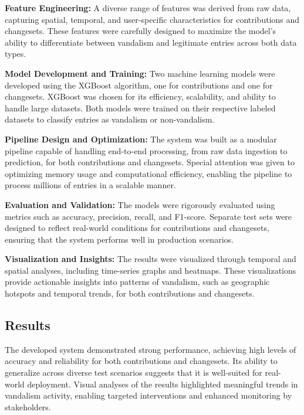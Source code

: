 \documentclass[
    13pt, %
    a4paper, %
    DIV14, %
    listof=totoc, %
    bibliography=totoc, %
    index=totoc, %
    headsepline
]{scrreprt}
\begin{document}
\noindent\textbf{Feature Engineering:} A diverse range of features was derived from raw data, capturing spatial, temporal, and user-specific characteristics for contributions and changesets. These features were carefully designed to maximize the model's ability to differentiate between vandalism and legitimate entries across both data types.

\noindent\textbf{Model Development and Training:} Two machine learning models were developed using the XGBoost algorithm, one for contributions and one for changesets. XGBoost was chosen for its efficiency, scalability, and ability to handle large datasets. Both models were trained on their respective labeled datasets to classify entries as vandalism or non-vandalism.

\noindent\textbf{Pipeline Design and Optimization:} The system was built as a modular pipeline capable of handling end-to-end processing, from raw data ingestion to prediction, for both contributions and changesets. Special attention was given to optimizing memory usage and computational efficiency, enabling the pipeline to process millions of entries in a scalable manner.

\noindent\textbf{Evaluation and Validation:} The models were rigorously evaluated using metrics such as accuracy, precision, recall, and F1-score. Separate test sets were designed to reflect real-world conditions for contributions and changesets, ensuring that the system performs well in production scenarios.

\noindent\textbf{Visualization and Insights:} The results were visualized through temporal and spatial analyses, including time-series graphs and heatmaps. These visualizations provide actionable insights into patterns of vandalism, such as geographic hotspots and temporal trends, for both contributions and changesets.

\subsection*{Results}

The developed system demonstrated strong performance, achieving high levels of accuracy and reliability for both contributions and changesets. Its ability to generalize across diverse test scenarios suggests that it is well-suited for real-world deployment. Visual analyses of the results highlighted meaningful trends in vandalism activity, enabling targeted interventions and enhanced monitoring by stakeholders.
\end{document}
